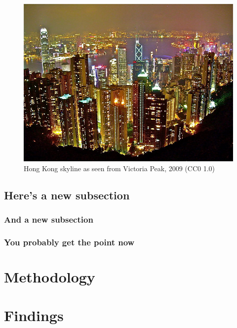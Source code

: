 \documentclass[a4paper, 12pt, american]{article}
\begin{document}
\lipsum[3]

\begin{figure}[h]
	\centering
	\includegraphics[width=\textwidth]{hong-kong-skyline.jpg}
	\caption{Hong Kong skyline as seen from Victoria Peak, 2009 (CC0 1.0)}
\end{figure}

\subsection{Here's a new subsection}

\lipsum[1]

\subsubsection{And a new subsection}

\lipsum[4]

\subsubsection{You probably get the point now}

\lipsum[1]

\newpage

\section{Methodology}

\lipsum[1]

\newpage

\section{Findings}
\end{document}

